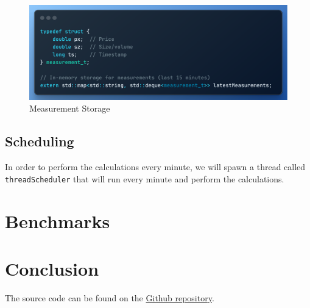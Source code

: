 \documentclass{article}
\begin{document}
\begin{figure}[H]
    \centering
    \includegraphics[width=1\textwidth]{measurement.png}
    \caption{Measurement Storage}
    \label{alg:measurements}
\end{figure}

\subsection{Scheduling}
In order to perform the calculations every minute, we will spawn a thread called \texttt{threadScheduler} that will run every minute and perform the calculations.



\section{Benchmarks}


\section{Conclusion}

The source code can be found on the \href{https://github.com/NontasBak/CUDA-bitonic-sort}{Github repository}.
\end{document}

